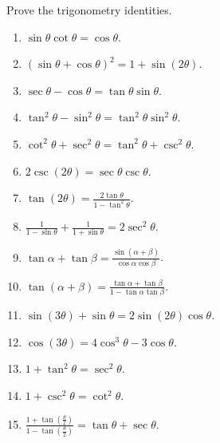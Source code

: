 Prove the trigonometry identities.
\begin{multicols}{3}
\begin{enumerate}[ref={\fcProblemRef}]
\item $\displaystyle \sin \theta\cot \theta =\cos \theta$.
\item $\displaystyle (\sin \theta +\cos \theta)^2=1+\sin(2\theta)$.
\item $\displaystyle \sec \theta - \cos \theta= \tan \theta \sin \theta$.
\item $\displaystyle \tan^2 \theta-\sin^2 \theta=\tan^2\theta\sin^2\theta$.
\item $\displaystyle \cot^2\theta+\sec^2\theta=\tan^2\theta+\csc^2\theta$.
\item $\displaystyle 2\csc (2\theta)= \sec \theta \csc \theta$.
\item $\displaystyle \tan (2\theta) =\frac{2\tan \theta}{1-\tan^2\theta} $.
\item $\displaystyle \frac{1}{1-\sin \theta}+ \frac{1}{1+\sin \theta}=2\sec^2\theta$.
\item $\displaystyle \tan \alpha + \tan \beta = \frac{\sin (\alpha+\beta)}{\cos \alpha \cos \beta}$.
\item $\displaystyle \tan (\alpha+\beta)= \frac{\tan \alpha +\tan \beta}{1-\tan \alpha\tan \beta}$.
\item $\displaystyle \sin (3\theta) +\sin \theta = 2 \sin (2\theta ) \cos \theta $.
\item $\displaystyle \cos (3\theta) = 4\cos^3\theta-3\cos \theta $.
\item $\displaystyle 1+\tan^2\theta = \sec^2\theta$.
\item $\displaystyle 1+\csc^2\theta = \cot^2\theta$.
\item $\displaystyle \frac{1+\tan \left(\frac{\theta}{2} \right) } {1 -\tan \left(\frac{\theta}{2}\right)}= \tan \theta +\sec \theta$.
\end{enumerate} 
\end{multicols}
